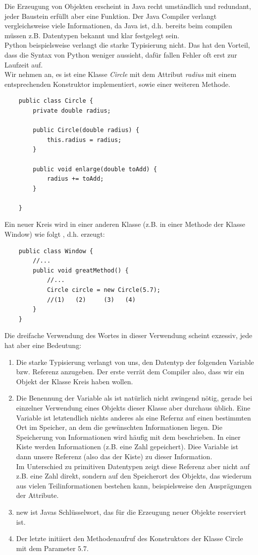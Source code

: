 \documentclass{article}
\begin{document}
Die Erzeugung von Objekten erscheint in Java recht umständlich und redundant, jeder Baustein erfüllt aber eine Funktion. Der Java Compiler verlangt vergleichsweise viele Informationen, da Java  ist, d.h. bereits beim compilen müssen z.B. Datentypen bekannt und klar festgelegt sein. \\
\textit{} Python beispielsweise verlangt die starke Typisierung nicht. Das hat den Vorteil, dass die Syntax von Python weniger  aussieht, dafür fallen Fehler oft erst zur Laufzeit auf. \\
Wir nehmen an, es ist eine Klasse \textit{Circle} mit dem Attribut \textit{radius} mit einem entsprechenden Konstruktor implementiert, sowie einer weiteren Methode.
\begin{verbatim}
    public class Circle {
        private double radius;

        public Circle(double radius) {
            this.radius = radius;
        }

        public void enlarge(double toAdd) {
            radius += toAdd;
        }

    }
\end{verbatim}
Ein neuer Kreis wird in einer anderen Klasse (z.B. in einer Methode der Klasse Window) wie folgt , d.h. erzeugt: 
\begin{verbatim}
    public class Window {
        //... 
        public void greatMethod() {
            //... 
            Circle circle = new Circle(5.7);
            //(1)   (2)     (3)   (4)
        }
    }
\end{verbatim}
Die dreifache Verwendung des Wortes  in dieser Verwendung scheint exzessiv, jede hat aber eine Bedeutung: 
\begin{enumerate}
    \item Die starke Typisierung verlangt von uns, den Datentyp der folgenden Variable bzw. Referenz anzugeben. Der erste  verrät dem Compiler also, dass wir ein Objekt der Klasse Kreis haben wollen. 
    \item Die Benennung der Variable als  ist natürlich nicht zwingend nötig, gerade bei einzelner Verwendung eines Objekts dieser Klasse aber durchaus üblich. Eine Variable ist letztendlich nichts anderes als eine Refernz auf einen bestimmten Ort im Speicher, an dem die gewünschten Informationen liegen. Die Speicherung von Informationen wird häufig mit dem  beschrieben. In einer Kiste werden Informationen (z.B. eine Zahl gepeichert). Diee Variable ist dann unsere Referenz (also das  der Kiste) zu dieser Information. \\
    Im Unterschied zu primitiven Datentypen zeigt diese Referenz aber nicht auf z.B. eine Zahl direkt, sondern auf den Speicherort des Objekts, das wiederum aus vielen Teilinformationen bestehen kann, beispielsweise den Ausprägungen der Attribute. 
    \item new ist Javas Schlüsselwort, das für die Erzeugung neuer Objekte reserviert ist. 
    \item Der letzte  initiiert den Methodenaufruf des Konstruktors der Klasse Circle mit dem Parameter $5.7$. 
\end{enumerate}
\end{document}
